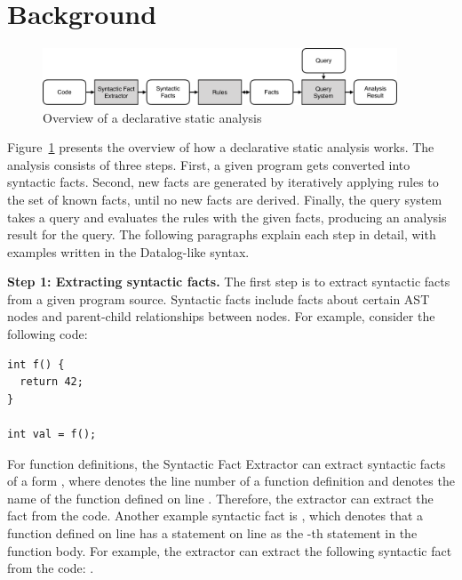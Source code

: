 \section{Background}\label{sec:background} 
\begin{figure}[t]
  \centering
  \vspace{2mm}
  \includegraphics[width=0.94\textwidth]{img/ov1.pdf}
  \caption{Overview of a declarative static analysis}
  \label{fig:ov1}
\end{figure}

Figure~\ref{fig:ov1} presents the overview of how a declarative static
analysis works.  The analysis consists of three steps.  First, a given program
gets converted into syntactic facts. 
Second, new facts are generated by iteratively applying rules to the set of
known facts, until no new facts are derived.  
Finally, the query system takes a query and evaluates the rules with the given
facts, producing an analysis result for the query. 
The following paragraphs explain each step in detail, with examples written in
the Datalog-like syntax.


\textbf{Step 1: Extracting syntactic facts.}
The first step is to extract syntactic facts from a given program source.
Syntactic facts include facts about certain AST nodes and
parent-child relationships between nodes. 
For example, consider the following code:

\begin{lstlisting}[style=mcpp]
int f() {
  return 42;
}

int val = f();
\end{lstlisting}

For function definitions, the Syntactic Fact Extractor can extract syntactic
facts of a form , where 
denotes the line number of a function definition and  denotes the
name of the function defined on line .  
Therefore, the extractor can extract the fact  from
the code.  
Another example syntactic fact is , which denotes that a function defined on line  has a statement on line  as the -th
statement in the function body.  For example, the extractor can extract the
following syntactic fact from the code: .

